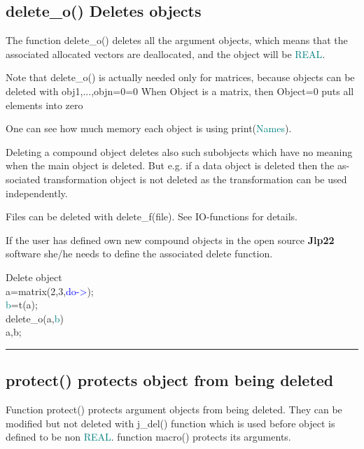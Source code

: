 {\subsection{\textcolor{VioletRed}{delete\_o}() Deletes objects} 
\label{deleteo} 
The function \textcolor{VioletRed}{delete\_o}() deletes all the argument objects, which means that the 
associated allocated vectors are deallocated, and the object will be \textcolor{teal}{REAL}. 
\begin{note} 
Note that \textcolor{VioletRed}{delete\_o}() is actually needed only for matrices, because objects 
can be deleted with obj1,...,objn=0=0 When Object is a matrix, then Object=0 puts all elements 
into zero 
\end{note} 
\begin{note} 
One can see how much memory each object is using \textcolor{VioletRed}{print}(\textcolor{teal}{Names}). 
\end{note} 
\begin{note} 
Deleting a compound object deletes also such 
subobjects which have no meaning when the main object is deleted. But e.g. if a 
data object is deleted then the as-sociated transformation object is not 
deleted as the transformation can be used independently. 
\end{note} 
\begin{note} 
Files can be deleted with \textcolor{VioletRed}{delete\_f}(file). See IO-functions for 
details. 
\end{note} 
\begin{note} 
If the user has defined own new compound objects in the open source 
\textbf{Jlp22} software she/he needs to define the associated delete function. 
\end{note} 
\singlespacing 
\begin{example}[deleteoex]Delete object\\ 
\label{deleteoex} 
\noindent a=\textcolor{VioletRed}{matrix}(2,3,\textcolor{blue}{do->});\\ 
\textcolor{teal}{b}=\textcolor{VioletRed}{t}(a);\\ 
\textcolor{VioletRed}{delete\_o}(a,\textcolor{teal}{b})\\ 
a,b;\\ 
\end{example} 
\vspace{-7mm} \rule{5cm}{0.1pt} 
\onehalfspacing 
\subsection{\textcolor{VioletRed}{protect}() protects object from being deleted} 
\label{protect} 
Function \textcolor{VioletRed}{protect}() protects argument objects from being deleted. They can be modified 
but not deleted with j\_del() function which is used before object is defined to be non \textcolor{teal}{REAL}. 
function \textcolor{VioletRed}{macro}() protects its arguments. 
}
